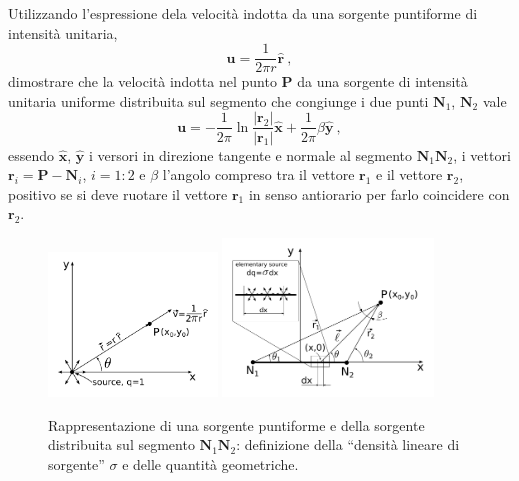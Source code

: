 \begin{exerciseS}
 Utilizzando l'espressione dela velocità indotta da una sorgente puntiforme di intensità unitaria,
\begin{equation}
 \bm{u} = \dfrac{1}{2\pi r} \bm{\hat{r}} \ ,
\end{equation}
 dimostrare che la velocità indotta nel punto $\bm{P}$ da una sorgente di intensità unitaria uniforme distribuita sul segmento che congiunge i due punti $\bm{N}_1$, $\bm{N}_2$ vale
\begin{equation}
 \bm{u} = - \dfrac{1}{2\pi} \ln \dfrac{|\bm{r}_2|}{|\bm{r}_1|} \bm{\hat{x}} 
 + \dfrac{1}{2\pi} \beta \bm{\hat{y}} \ ,
\end{equation}
 essendo $\bm{\hat{x}}$, $\bm{\hat{y}}$ i versori in direzione tangente e normale al segmento $\bm{N}_1 \bm{N}_2$, i vettori $\bm{r}_i = \bm{P} - \bm{N}_i$, $i = 1:2$ e $\beta$ l'angolo compreso tra il vettore $\bm{r}_1$ e il vettore $\bm{r}_2$, positivo se si deve ruotare il vettore $\bm{r}_1$ in senso antiorario per farlo coincidere con $\bm{r}_2$.
\end{exerciseS}

\begin{center}
\begin{figure}[h]
\centering
\includegraphics[width=0.40\textwidth]{./fig/pointSource}
\includegraphics[width=0.50\textwidth]{./fig/lineSource}
\caption{Rappresentazione di una sorgente puntiforme e della sorgente distribuita sul segmento $\bm{N}_1 \bm{N}_2$: definizione della ``densità lineare di sorgente'' $\sigma$ e  delle quantità geometriche.}\label{fig:lineSource}
\end{figure}
\end{center}

